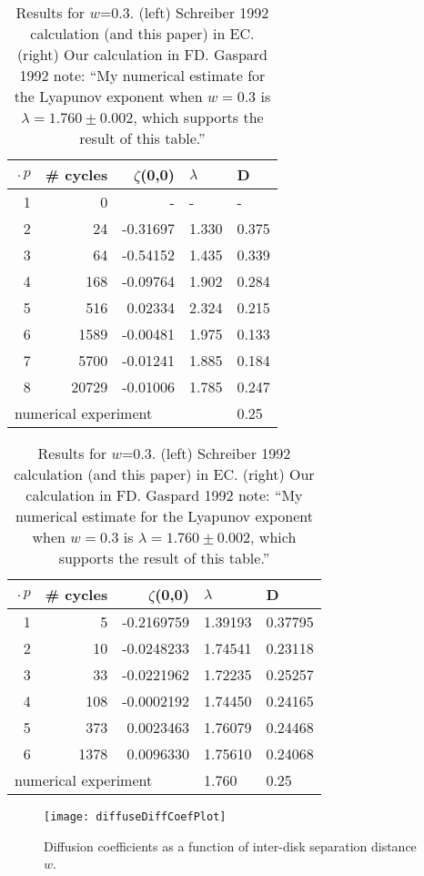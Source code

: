 \documentclass[aps,pre,preprint,groupedaddress, floatfix]{revtex4-1}
\begin{document}
\begin{table}[htbp]
{\small
\begin{tabular}{|r|r|r|l|l|}
\hline
$\period{p}$ & \# cycles & $\zeta$(0,0) & $\lambda$ & D \\ \hline\hline
1      & 0      &   -    &   -  &   - \\
2      & 24     & -0.31697 & 1.330 & 0.375\\
3      & 64     & -0.54152 & 1.435 & 0.339\\
4      & 168    & -0.09764 & 1.902 & 0.284\\
5      & 516    &  0.02334 & 2.324 & 0.215\\
6      & 1589   & -0.00481 & 1.975 & 0.133\\
7      & 5700   & -0.01241 & 1.885 & 0.184\\
8      & 20729  & -0.01006 & 1.785 & 0.247\\ \hline\hline
\multicolumn{4}{|l|}{numerical experiment} 1.760 & 0.25 \\ \hline
\end{tabular}
\hfill
\begin{tabular}{|r|r|r|l|l|}
\hline
$\period{p}$ & \# cycles & $\zeta$(0,0) & $\lambda$ & D \\ \hline\hline
1      & 5      &   -0.2169759    &   1.39193  &   0.37795 \\
2      & 10     & -0.0248233 & 1.74541 & 0.23118\\
3      & 33     & -0.0221962 & 1.72235 & 0.25257\\
4      & 108    & -0.0002192 & 1.74450 & 0.24165\\
5      & 373    &  0.0023463 & 1.76079 & 0.24468\\
6      & 1378   &  0.0096330 & 1.75610 & 0.24068\\ \hline\hline
\multicolumn{3}{|l|}{numerical experiment}
                           & 1.760 & 0.25
\\ \hline
\end{tabular}
}

\caption{\label{TCELL2}
Results for $w$=0.3. (left) Schreiber 1992 calculation (and
this paper) in EC. (right) Our calculation in FD. Gaspard 1992
note: ``My numerical estimate for the Lyapunov exponent when $w=0.3$ is
$\lambda = 1.760 \pm 0.002$, which supports the result of this table.''
}
\end{table}

\begin{figure}
\texttt{[image: diffuseDiffCoefPlot]}
\caption[]{\label{fig:results}
Diffusion coefficients as a function of inter-disk separation distance
$w$.
          }
\end{figure}
\end{document}

